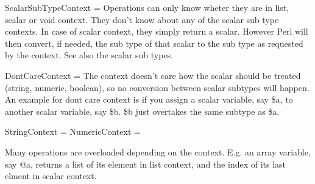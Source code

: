 \documentclass{article}
\begin{document}
ScalarSubTypeContext = 
Operations can only know wheter they are in list, scalar or void
context. They don't know about any of the scalar sub type contexts. In
case of scalar context, they simply return a scalar. However Perl will
then convert, if needed, the sub type of that scalar to the sub type
as requested by the context. See also the scalar sub types.

DontCareContext =
The context doesn't care how the scalar should be treated (string,
numeric, boolean), so no conversion between scalar subtypes will
happen. An example for dont care context is if you assign a scalar
variable, say \$a, to another scalar variable, say \$b. \$b just
overtakes the same subtype as \$a.

StringContext =
NumericContext =

Many operations are overloaded depending on the context. E.g. an
array variable, say @a, returns a list of its element in list context,
and the index of its last elment in scalar context. 
\end{document}
